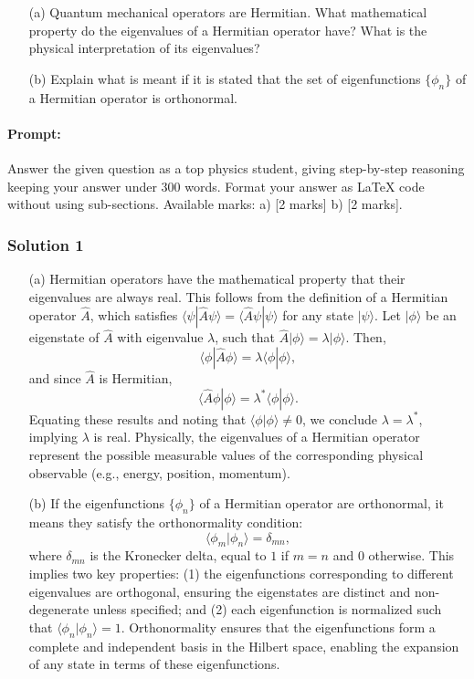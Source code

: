 \documentclass{article}
\begin{document}
\begin{enumerate}
    \item[(a)] Quantum mechanical operators are Hermitian. What mathematical property do the eigenvalues of a Hermitian operator have? What is the physical interpretation of its eigenvalues?
    \item[(b)] Explain what is meant if it is stated that the set of eigenfunctions $\{\phi_n\}$ of a Hermitian operator is orthonormal.
\end{enumerate}


\paragraph{Prompt: \\} 
Answer the given question as a top physics student, giving step-by-step reasoning keeping your answer under 300 words. Format your answer as LaTeX code without using sub-sections. Available marks: a) [2 marks] b) [2 marks].

\subsubsection{Solution 1}
\begin{enumerate}
    \item[(a)] Hermitian operators have the mathematical property that their eigenvalues are always real. This follows from the definition of a Hermitian operator $\hat{A}$, which satisfies $\langle \psi | \hat{A} \psi \rangle = \langle \hat{A} \psi | \psi \rangle$ for any state $|\psi\rangle$. Let $|\phi\rangle$ be an eigenstate of $\hat{A}$ with eigenvalue $\lambda$, such that $\hat{A} |\phi\rangle = \lambda |\phi\rangle$. Then, 
    \[
    \langle \phi | \hat{A} \phi \rangle = \lambda \langle \phi | \phi \rangle,
    \]
    and since $\hat{A}$ is Hermitian, 
    \[
    \langle \hat{A} \phi | \phi \rangle = \lambda^* \langle \phi | \phi \rangle.
    \]
    Equating these results and noting that $\langle \phi | \phi \rangle \neq 0$, we conclude $\lambda = \lambda^*$, implying $\lambda$ is real. Physically, the eigenvalues of a Hermitian operator represent the possible measurable values of the corresponding physical observable (e.g., energy, position, momentum).

    \item[(b)] If the eigenfunctions $\{\phi_n\}$ of a Hermitian operator are orthonormal, it means they satisfy the orthonormality condition:
    \[
    \langle \phi_m | \phi_n \rangle = \delta_{mn},
    \]
    where $\delta_{mn}$ is the Kronecker delta, equal to $1$ if $m = n$ and $0$ otherwise. This implies two key properties: (1) the eigenfunctions corresponding to different eigenvalues are orthogonal, ensuring the eigenstates are distinct and non-degenerate unless specified; and (2) each eigenfunction is normalized such that $\langle \phi_n | \phi_n \rangle = 1$. Orthonormality ensures that the eigenfunctions form a complete and independent basis in the Hilbert space, enabling the expansion of any state in terms of these eigenfunctions.
\end{enumerate}
\end{document}

